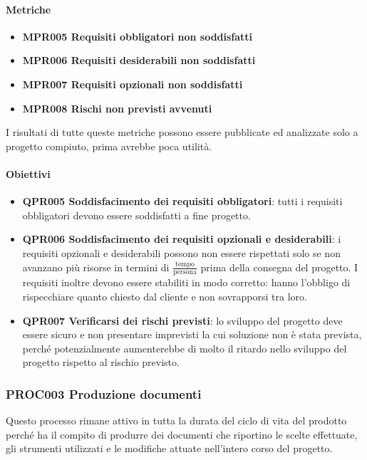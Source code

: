 		\paragraph*{Metriche}

		\begin{itemize}
			\item \textbf{MPR005 Requisiti obbligatori non soddisfatti}
			\item \textbf{MPR006 Requisiti desiderabili non soddisfatti}
			\item \textbf{MPR007 Requisiti opzionali non soddisfatti}
			\item \textbf{MPR008 Rischi non previsti avvenuti}
		\end{itemize}
		I risultati di tutte queste metriche possono essere pubblicate ed analizzate solo a progetto compiuto, prima avrebbe poca utilità. 
	
		\paragraph*{Obiettivi}
		
		\begin{itemize}
			\item \textbf{QPR005 Soddisfacimento dei requisiti obbligatori}: tutti i requisiti obbligatori devono essere soddisfatti a fine progetto.
			\item \textbf{QPR006 Soddisfacimento dei requisiti opzionali e desiderabili}: i requisiti opzionali e desiderabili possono non essere rispettati
				solo se non avanzano più risorse in termini di $ \frac{\text{tempo}}{\text{persona}}$ prima della consegna del progetto. I requisiti inoltre
				devono essere stabiliti in modo corretto: hanno l'obbligo di rispecchiare quanto chiesto dal cliente e non sovrapporsi tra loro.
			\item \textbf{QPR007 Verificarsi dei rischi previsti}: lo sviluppo del progetto deve essere sicuro e non presentare imprevisti la cui soluzione non è stata prevista, perché potenzialmente aumenterebbe di molto il ritardo nello sviluppo del progetto rispetto al rischio previsto.
		\end{itemize}
	
	\subsubsection{PROC003 Produzione documenti}
	Questo processo rimane attivo in tutta la durata del ciclo di vita del prodotto perché ha il compito di produrre dei documenti che riportino le scelte effettuate, gli strumenti utilizzati e le modifiche attuate nell'intero corso del progetto.
	
